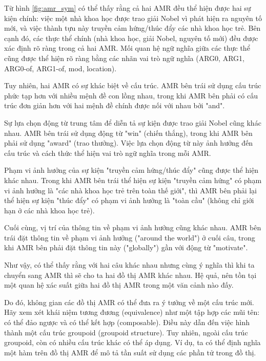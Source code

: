 Từ hình \ref{fig:amr_sym} có thể thấy rằng cả hai AMR đều thể hiện được hai sự kiện chính: việc một nhà khoa học được trao giải Nobel vì phát hiện ra nguyên tố mới, và việc thành tựu này truyền cảm hứng/thúc đẩy các nhà khoa học trẻ. Bên cạnh đó, các thực thể chính (nhà khoa học, giải Nobel, nguyên tố mới) đều được xác định rõ ràng trong cả hai AMR. Mối quan hệ ngữ nghĩa giữa các thực thể cũng được thể hiện rõ ràng bằng các nhãn vai trò ngữ nghĩa (ARG0, ARG1, ARG0-of, ARG1-of, mod, location).

Tuy nhiên, hai AMR có sự khác biệt về cấu trúc. AMR bên trái sử dụng cấu trúc phức tạp hơn với nhiều mệnh đề con lồng nhau, trong khi AMR bên phải có cấu trúc đơn giản hơn với hai mệnh đề chính được nối với nhau bởi "and".

Sự lựa chọn động từ trung tâm để diễn tả sự kiện được trao giải Nobel cũng khác nhau. AMR bên trái sử dụng động từ "win" (chiến thắng), trong khi AMR bên phải sử dụng "award" (trao thưởng). Việc lựa chọn động từ này ảnh hưởng đến cấu trúc và cách thức thể hiện vai trò ngữ nghĩa trong mỗi AMR.

Phạm vi ảnh hưởng của sự kiện "truyền cảm hứng/thúc đẩy" cũng được thể hiện khác nhau. Trong khi AMR bên trái thể hiện sự kiện "truyền cảm hứng" có phạm vi ảnh hưởng là "các nhà khoa học trẻ trên toàn thế giới", thì AMR bên phải lại thể hiện sự kiện "thúc đẩy" có phạm vi ảnh hưởng là "toàn cầu" (không chỉ giới hạn ở các nhà khoa học trẻ).

Cuối cùng, vị trí của thông tin về phạm vi ảnh hưởng cũng khác nhau. AMR bên trái đặt thông tin về phạm vi ảnh hưởng ("around the world") ở cuối câu, trong khi AMR bên phải đặt thông tin này ("globally") gần với động từ "motivate".

Như vậy, có thể thấy rằng với hai câu khác nhau nhưng cùng ý nghĩa thì khi ta chuyển sang AMR thì sẽ cho ta hai đồ thị AMR khác nhau. Hệ quả, nên tồn tại một quan hệ xác suất giữa hai đồ thị AMR trong một văn cảnh nào đấy. 

Do đó, không gian các đồ thị AMR có thể đưa ra ý tưởng về một cấu trúc mới. Hãy xem xét khái niệm tương đương (equivalence) như một tập hợp các mũi tên: có thể đảo ngược và có thể kết hợp (composable). Điều này dẫn đến việc hình thành một cấu trúc groupoid (groupoid structure). Tuy nhiên, ngoài cấu trúc groupoid, còn có nhiều cấu trúc khác có thể áp dụng. Ví dụ, ta có thể định nghĩa một hàm trên đồ thị AMR để mô tả tần suất sử dụng các phần tử trong đồ thị.

